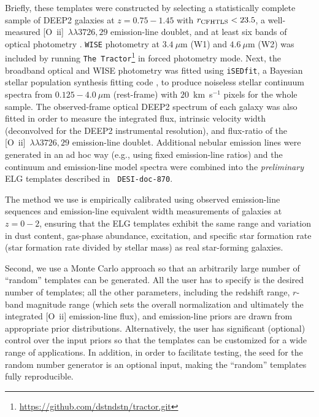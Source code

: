 \documentclass[12pt]{article}
\newcommand{\oii}{[O~{\sc ii}]}
\newcommand{\oiilam}{[O~{\sc ii}]~\ensuremath{\lambda\lambda3726,29}}
\newcommand{\kms}{km~s$^{-1}$}
\newcommand{\isedfit}{{\tt iSEDfit}}
\begin{document}
Briefly, these templates were constructed by selecting a statistically complete
sample of DEEP2 galaxies at $z=0.75-1.45$ with $r_{\rm CFHTLS}<23.5$, a
well-measured \oiilam{} emission-line doublet, and at least six bands of optical
photometry \citep{newman13a, matthews13a}.  {\tt WISE} photometry at $3.4~\mu$m
(W1) and $4.6~\mu$m (W2) was included by running {\tt The
  Tractor}\footnote{\url{https://github.com/dstndstn/tractor.git}} in forced
photometry mode.  Next, the broadband optical and WISE photometry was fitted
using \isedfit, a Bayesian stellar population synthesis fitting code
\citep{moustakas13a}, to produce noiseless stellar continuum spectra from
$0.125-4.0~\mu$m (rest-frame) with $20$~\kms{} pixels for the whole sample.  The
observed-frame optical DEEP2 spectrum of each galaxy was also fitted in order to
measure the integrated flux, intrinsic velocity width (deconvolved for the DEEP2
instrumental resolution), and flux-ratio of the \oiilam{} emission-line doublet.
Additional nebular emission lines were generated in an ad hoc way (e.g., using
fixed emission-line ratios) and the continuum and emission-line model spectra
were combined into the \emph{preliminary} ELG templates described in {\tt
  DESI-doc-870}.


The method we use is
empirically calibrated using observed emission-line sequences and emission-line
equivalent width measurements of galaxies at $z=0-2$, ensuring that the ELG
templates exhibit the same range and variation in dust content, gas-phase
abundance, excitation, and specific star formation rate (star formation rate
divided by stellar mass) as real star-forming galaxies.

Second, we use a Monte Carlo approach so that an arbitrarily large number of
``random'' templates can be generated.  All the user has to specify is the
desired number of templates; all the other parameters, including the redshift
range, $r$-band magnitude range (which sets the overall normalization and
ultimately the integrated \oii{} emission-line flux), and emission-line priors
are drawn from appropriate prior distributions.  Alternatively, the user has
significant (optional) control over the input priors so that the templates can
be customized for a wide range of applications.  In addition, in order to
facilitate testing, the seed for the random number generator is an optional
input, making the ``random'' templates fully reproducible.
\end{document}
